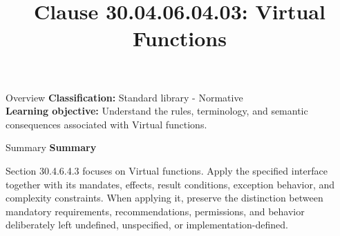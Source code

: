 \documentclass[10pt,letterpaper]{article}
\title{Clause 30.04.06.04.03: Virtual Functions}
\author{}
\date{}
\begin{document}
\maketitle
\begin{CornellOverviewBox}{Overview}
\textbf{Classification:} Standard library - Normative\\[2pt]
\textbf{Learning objective:} Understand the rules, terminology, and semantic consequences associated with Virtual functions.
\end{CornellOverviewBox}\begin{CornellSummaryBox}{Summary}
{\sffamily\bfseries\color{Accent} Summary}\par\vspace{3pt}Section 30.4.6.4.3 focuses on Virtual functions. Apply the specified interface together with its mandates, effects, result conditions, exception behavior, and complexity constraints. When applying it, preserve the distinction between mandatory requirements, recommendations, permissions, and behavior deliberately left undefined, unspecified, or implementation-defined.
\end{CornellSummaryBox}
\end{document}
